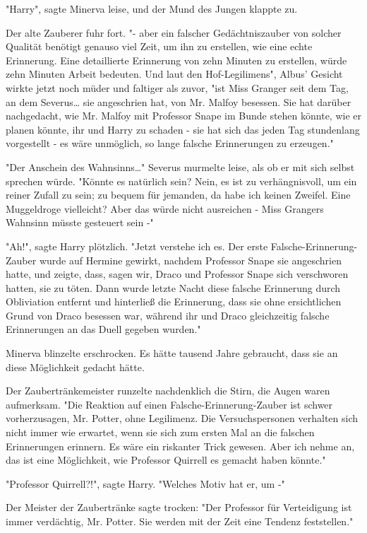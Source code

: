 {"Harry", sagte Minerva leise, und der Mund des Jungen klappte zu.

Der alte Zauberer fuhr fort. "- aber ein falscher Gedächtniszauber von solcher Qualität benötigt genauso viel Zeit, um ihn zu erstellen, wie eine echte Erinnerung. Eine detaillierte Erinnerung von zehn Minuten zu erstellen, würde zehn Minuten Arbeit bedeuten. Und laut den Hof-Legilimens", Albus' Gesicht wirkte jetzt noch müder und faltiger als zuvor, "ist Miss Granger seit dem Tag, an dem Severus… sie angeschrien hat, von Mr. Malfoy besessen. Sie hat darüber nachgedacht, wie Mr. Malfoy mit Professor Snape im Bunde stehen könnte, wie er planen könnte, ihr und Harry zu schaden - sie hat sich das jeden Tag stundenlang vorgestellt - es wäre unmöglich, so lange falsche Erinnerungen zu erzeugen."

"Der Anschein des Wahnsinns…" Severus murmelte leise, als ob er mit sich selbst sprechen würde. "Könnte es natürlich sein? Nein, es ist zu verhängnisvoll, um ein reiner Zufall zu sein; zu bequem für jemanden, da habe ich keinen Zweifel. Eine Muggeldroge vielleicht? Aber das würde nicht ausreichen - Miss Grangers Wahnsinn müsste gesteuert sein -"

"Ah!", sagte Harry plötzlich. "Jetzt verstehe ich es. Der erste Falsche-Erinnerung-Zauber wurde auf Hermine gewirkt, nachdem Professor Snape sie angeschrien hatte, und zeigte, dass, sagen wir, Draco und Professor Snape sich verschworen hatten, sie zu töten. Dann wurde letzte Nacht diese falsche Erinnerung durch Obliviation entfernt und hinterließ die Erinnerung, dass sie ohne ersichtlichen Grund von Draco besessen war, während ihr und Draco gleichzeitig falsche Erinnerungen an das Duell gegeben wurden."

Minerva blinzelte erschrocken. Es hätte tausend Jahre gebraucht, dass sie an diese Möglichkeit gedacht hätte.

Der Zaubertränkemeister runzelte nachdenklich die Stirn, die Augen waren aufmerksam. "Die Reaktion auf einen Falsche-Erinnerung-Zauber ist schwer vorherzusagen, Mr. Potter, ohne Legilimenz. Die Versuchspersonen verhalten sich nicht immer wie erwartet, wenn sie sich zum ersten Mal an die falschen Erinnerungen erinnern. Es wäre ein riskanter Trick gewesen. Aber ich nehme an, das ist eine Möglichkeit, wie Professor Quirrell es gemacht haben könnte."

"Professor Quirrell?!", sagte Harry. "Welches Motiv hat er, um -"

Der Meister der Zaubertränke sagte trocken: "Der Professor für Verteidigung ist immer verdächtig, Mr. Potter. Sie werden mit der Zeit eine Tendenz feststellen."

}
